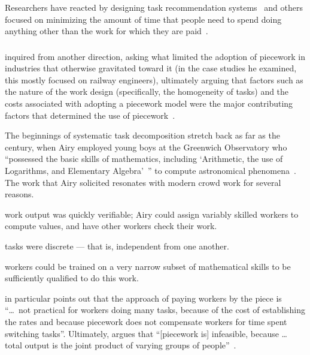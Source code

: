 \documentclass[trackingWork]{subfiles}
\begin{document}
Researchers have reacted by designing task recommendation systems~\cite[e.g.][]{Cosley:2007:SUI:1216295.1216309}
and others focused on
minimizing the amount of time that people need to spend doing anything other than
the work for which they are paid~\cite{callison2014crowd}.



\onlyinsubfile{\newpage}
\subsubsection{\pieceworkpers}
\citeauthor{Brown01041990} inquired from another direction,
asking
what limited the adoption of piecework in industries that otherwise gravitated toward it
(in the case studies he examined,
this mostly focused on railway engineers),
ultimately arguing that factors such as the nature of the work design
(specifically,
the homogeneity of tasks) and the costs associated with adopting a piecework model
were the major contributing factors that determined the use of piecework~\cite{Brown01041990}.




The beginnings of
systematic task decomposition 
stretch back as far as the  century,
when Airy employed young boys at the Greenwich Observatory who
``possessed the basic skills of mathematics,
including
`Arithmetic,
the use of Logarithms,
and Elementary Algebra'~''
to compute astronomical phenomena~\cite{grier2013computers}.
The work that Airy solicited resonates with modern crowd work for several reasons.
\begin{Numberlist}
\item work output was quickly verifiable;
Airy could assign variably skilled workers to compute values,
and have other workers check their work.
\item tasks were discrete
--- that is,
independent from one another.
\item workers could be trained on a very narrow subset of mathematical skills to be
sufficiently qualified to do this work.
\end{Numberlist}


\citeauthor{bewley1999wages} in particular points out that
the approach of paying workers by the piece is
``\dots~not practical for workers doing many tasks,
because of
the cost of establishing the rates and because
piecework does not compensate workers for time spent switching tasks''.
Ultimately, \citeauthor{bewley1999wages} argues that
``[piecework is] infeasible,
because \dots
total output is the joint product of varying groups of people''~\cite{bewley1999wages}.
\end{document}
